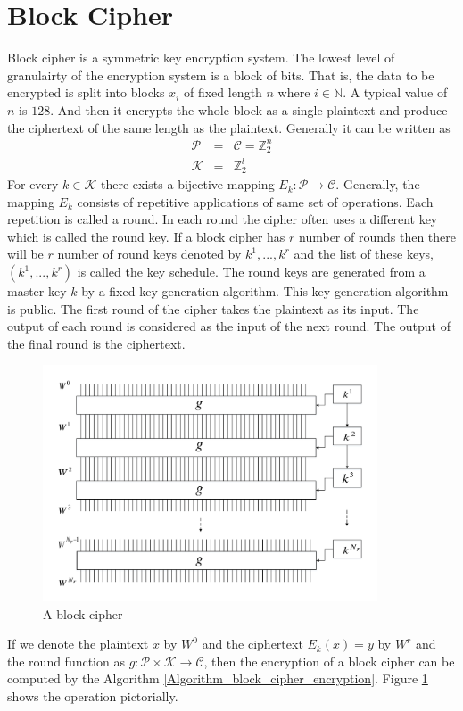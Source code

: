 \section{Block Cipher} 
Block cipher is a symmetric key encryption system. The lowest level of granulairty of the encryption system is a block of bits. That is, the data to be encrypted is split into blocks $x_i$ of fixed length $n$ where $i \in \mathbb{N}$. A typical value of $n$ is $128$. And then it encrypts the whole block as a single plaintext and produce the ciphertext of the same length as the plaintext. Generally it can be written as 
\begin{eqnarray*}
\mathcal{P} &=& \mathcal{C} = \mathbb{Z}_2^n \\
\mathcal{K} &=& \mathbb{Z}_2^l
\end{eqnarray*}
For every $k \in \mathcal{K}$ there exists a bijective mapping $E_k:\mathcal{P} \rightarrow \mathcal{C}$. Generally, the mapping $E_k$ consists of repetitive applications of same set of operations. Each repetition is called a round. In each round the cipher often uses a different key which is called the round key. If a block cipher has $r$ number of rounds then there will be $r$ number of round keys denoted by $k^{1}, ...,k^{r}$ and the list of these keys, $(k^1,...,k^{r})$ is called the key schedule. The round keys are generated from a master key $k$ by a fixed key generation algorithm. This key generation algorithm is public. The first round of the cipher takes the plaintext as its input. The output of each round is considered as the input of the next round. The output of the final round is the ciphertext.
\begin{figure}[h!]
    \centering
    \includegraphics[width=.9\textwidth, height = 7cm]{images/BlockCipher}
    \caption{A block cipher}
    \label{fig:block_cipher}
\end{figure}If we denote the plaintext $x$ by $W^0$ and the ciphertext $E_k(x) = y$ by $W^{r}$ and the round function as $g:\mathcal{P \times \mathcal{K}} \rightarrow \mathcal{C}$, then the encryption of a block cipher can be computed by the Algorithm \ref{Algorithm_block_cipher_encryption}. Figure \ref{fig:block_cipher} shows the operation pictorially.
